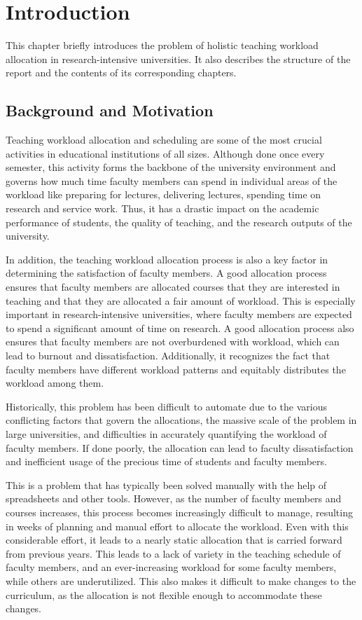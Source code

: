 \chapter{Introduction}

This chapter briefly introduces the problem of holistic teaching workload allocation in research-intensive universities. It also describes the structure of the report and the contents of its corresponding chapters.

\section{Background and Motivation}

Teaching workload allocation and scheduling are some of the most crucial activities in educational institutions of all sizes. Although done once every semester, this activity forms the backbone of the university environment and governs how much time faculty members can spend in individual areas of the workload like preparing for lectures, delivering lectures, spending time on research and service work. Thus, it has a drastic impact on the academic performance of students, the quality of teaching, and the research outputs of the university.

In addition, the teaching workload allocation process is also a key factor in determining the satisfaction of faculty members. A good allocation process ensures that faculty members are allocated courses that they are interested in teaching and that they are allocated a fair amount of workload. This is especially important in research-intensive universities, where faculty members are expected to spend a significant amount of time on research. A good allocation process also ensures that faculty members are not overburdened with workload, which can lead to burnout and dissatisfaction. Additionally, it recognizes the fact that faculty members have different workload patterns and equitably distributes the workload among them.

Historically, this problem has been difficult to automate due to the various conflicting factors that govern the allocations, the massive scale of the problem in large universities, and difficulties in accurately quantifying the workload of faculty members. If done poorly, the allocation can lead to faculty dissatisfaction and inefficient usage of the precious time of students and faculty members.

This is a problem that has typically been solved manually with the help of spreadsheets and other tools. However, as the number of faculty members and courses increases, this process becomes increasingly difficult to manage, resulting in weeks of planning and manual effort to allocate the workload. Even with this considerable effort, it leads to a nearly static allocation that is carried forward from previous years. This leads to a lack of variety in the teaching schedule of faculty members, and an ever-increasing workload for some faculty members, while others are underutilized. This also makes it difficult to make changes to the curriculum, as the allocation is not flexible enough to accommodate these changes.

